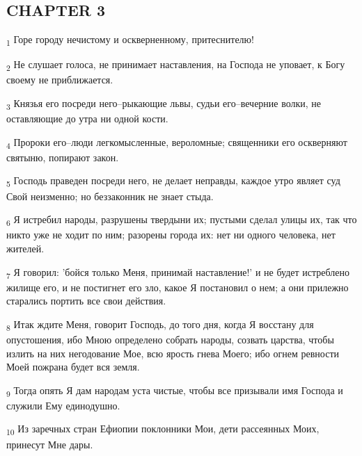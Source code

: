 \subsection{CHAPTER 3}
\begin{tcolorbox}
\textsubscript{1} Горе городу нечистому и оскверненному, притеснителю!
\end{tcolorbox}
\begin{tcolorbox}
\textsubscript{2} Не слушает голоса, не принимает наставления, на Господа не уповает, к Богу своему не приближается.
\end{tcolorbox}
\begin{tcolorbox}
\textsubscript{3} Князья его посреди него--рыкающие львы, судьи его--вечерние волки, не оставляющие до утра ни одной кости.
\end{tcolorbox}
\begin{tcolorbox}
\textsubscript{4} Пророки его--люди легкомысленные, вероломные; священники его оскверняют святыню, попирают закон.
\end{tcolorbox}
\begin{tcolorbox}
\textsubscript{5} Господь праведен посреди него, не делает неправды, каждое утро являет суд Свой неизменно; но беззаконник не знает стыда.
\end{tcolorbox}
\begin{tcolorbox}
\textsubscript{6} Я истребил народы, разрушены твердыни их; пустыми сделал улицы их, так что никто уже не ходит по ним; разорены города их: нет ни одного человека, нет жителей.
\end{tcolorbox}
\begin{tcolorbox}
\textsubscript{7} Я говорил: 'бойся только Меня, принимай наставление!' и не будет истреблено жилище его, и не постигнет его зло, какое Я постановил о нем; а они прилежно старались портить все свои действия.
\end{tcolorbox}
\begin{tcolorbox}
\textsubscript{8} Итак ждите Меня, говорит Господь, до того дня, когда Я восстану для опустошения, ибо Мною определено собрать народы, созвать царства, чтобы излить на них негодование Мое, всю ярость гнева Моего; ибо огнем ревности Моей пожрана будет вся земля.
\end{tcolorbox}
\begin{tcolorbox}
\textsubscript{9} Тогда опять Я дам народам уста чистые, чтобы все призывали имя Господа и служили Ему единодушно.
\end{tcolorbox}
\begin{tcolorbox}
\textsubscript{10} Из заречных стран Ефиопии поклонники Мои, дети рассеянных Моих, принесут Мне дары.
\end{tcolorbox}

